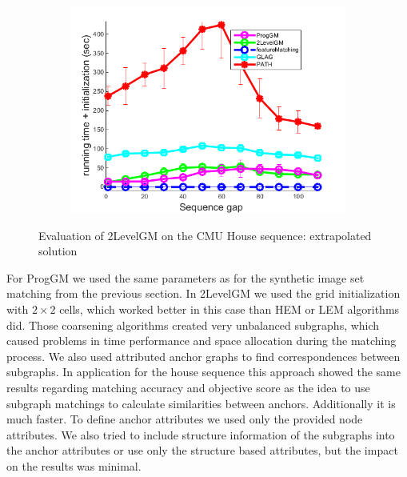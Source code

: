 \begin{figure}[h]
\begin{subfigure}[b]{0.32\textwidth}
			\includegraphics[scale=0.25]{"chapter3/fig/HouseSeq2/anchor_descr/using_cpd_afftrafo/ext_solution2/performance/time_summary"}
		\end{subfigure} 	
	\caption[Evaluation of 2LevelGM on the CMU House sequence]{Evaluation of 2LevelGM on the CMU House sequence: extrapolated solution} \label{fig:House_ext_sol}
\end{figure}

For ProgGM we used the same parameters as for the synthetic image set matching from the previous section.
In 2LevelGM we used the grid initialization with $2\times 2$ cells, which worked better in this case than HEM or LEM algorithms did. Those coarsening algorithms created very unbalanced subgraphs, which caused problems in time performance and space allocation during the matching process. We also used attributed anchor graphs to find correspondences between subgraphs. In application for the house sequence this approach showed the same results regarding matching accuracy and objective score as the idea to use subgraph matchings to calculate similarities between anchors. Additionally it is much faster. To define anchor attributes we used only the provided node attributes. We also tried to include structure information of the subgraphs into the anchor attributes or use only the structure based attributes, but the impact on the results was minimal.

